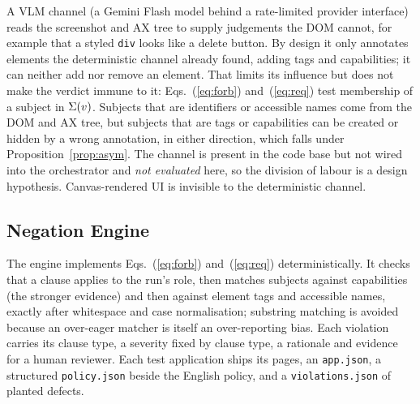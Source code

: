A VLM channel (a Gemini Flash model behind a rate-limited provider interface) reads the screenshot and AX tree to supply judgements the DOM cannot,
for example that a styled \texttt{div} looks like a delete button. By design it only
annotates elements the deterministic channel already found, adding tags and
capabilities; it can neither add nor remove an element. That limits its influence
but does not make the verdict immune to it: Eqs.~(\ref{eq:forb}) and~(\ref{eq:req})
test membership of a subject in $\Sigma(v)$. Subjects that are identifiers or
accessible names come from the DOM and AX tree, but subjects that are tags or
capabilities can be created or hidden by a wrong annotation, in either direction,
which falls under Proposition~\ref{prop:asym}. The channel is present in the code base but not wired
into the orchestrator and \emph{not evaluated} here, so the division of labour is a
design hypothesis. Canvas-rendered UI is invisible to the deterministic channel.

\subsection{Negation Engine}
\label{sec:negation}

The engine implements Eqs.~(\ref{eq:forb}) and~(\ref{eq:req}) deterministically.
It checks that a clause applies to the run's role, then matches subjects against
capabilities (the stronger evidence) and then against element tags and accessible
names, exactly after whitespace and case normalisation; substring matching is
avoided because an over-eager matcher is itself an over-reporting bias.
Each violation carries its clause type, a severity fixed by clause type, a
rationale and evidence for a human reviewer. Each test application ships its pages,
an \texttt{app.json}, a structured \texttt{policy.json} beside the English policy,
and a \texttt{violations.json} of planted defects.
